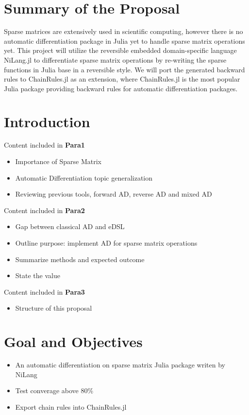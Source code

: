 \section{Summary of the Proposal}

Sparse matrices are extensively used in scientific computing, however there is no automatic differentiation package in Julia yet to handle sparse matrix operations yet. This project will utilize the reversible embedded domain-specific language NiLang.jl to differentiate sparse matrix operations by re-writing the sparse functions in Julia base in a reversible style. We will port the generated backward rules to ChainRules.jl as an extension, where ChainRules.jl is the most popular Julia package providing backward rules for automatic differentiation packages.

\section{Introduction}

Content included in \textbf{Para1}
\begin{itemize}
    \item Importance of Sparse Matrix
    \item Automatic Differentiation topic generalization
    \item Reviewing previous tools, forward AD, reverse AD and mixed AD
\end{itemize}

Content included in \textbf{Para2}
\begin{itemize}
    \item Gap between classical AD and eDSL\cite{liu2020differentiate}
    \item Outline purpose: implement AD for sparse matrix operations
    \item Summarize methods and expected outcome
    \item State the value
\end{itemize}

Content included in \textbf{Para3}  
\begin{itemize}
    \item Structure of this proposal
\end{itemize}




\section{Goal and Objectives}
\label{sec:goals}
\begin{itemize}
    \item An automatic differentiation on sparse matrix Julia package writen by NiLang
    \item Test converage above 80\%
    \item  Export chain rules into ChainRules.jl
\end{itemize} 

